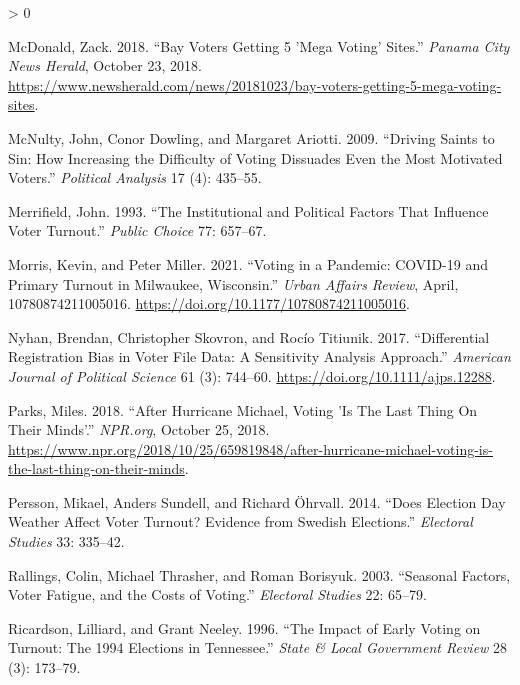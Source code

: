 \documentclass[
  12pt,
]{article}
\newlength{\cslhangindent}
\newenvironment{CSLReferences}[2] %
 {%
  \setlength{\parindent}{0pt}
  \ifodd #1 \everypar{\setlength{\hangindent}{\cslhangindent}}\ignorespaces\fi
  \ifnum #2 > 0
  \setlength{\parskip}{#2\baselineskip}
  \fi
 }%
 {}
\begin{document}
\begin{CSLReferences}{1}{0}
\leavevmode\hypertarget{ref-McDonald2018}{}%
McDonald, Zack. 2018. {``Bay Voters Getting 5 'Mega Voting' Sites.''} \emph{Panama City News Herald}, October 23, 2018. \url{https://www.newsherald.com/news/20181023/bay-voters-getting-5-mega-voting-sites}.

\leavevmode\hypertarget{ref-McNulty2009}{}%
McNulty, John, Conor Dowling, and Margaret Ariotti. 2009. {``Driving {Saints} to {Sin}: {How Increasing} the {Difficulty} of {Voting Dissuades Even} the {Most Motivated Voters}.''} \emph{Political Analysis} 17 (4): 435--55.

\leavevmode\hypertarget{ref-Merrifield1993}{}%
Merrifield, John. 1993. {``The {Institutional} and {Political Factors} That {Influence Voter Turnout}.''} \emph{Public Choice} 77: 657--67.

\leavevmode\hypertarget{ref-Morris2021}{}%
Morris, Kevin, and Peter Miller. 2021. {``Voting in a {Pandemic}: {COVID}-19 and {Primary Turnout} in {Milwaukee}, {Wisconsin}.''} \emph{Urban Affairs Review}, April, 10780874211005016. \url{https://doi.org/10.1177/10780874211005016}.

\leavevmode\hypertarget{ref-Nyhan2017}{}%
Nyhan, Brendan, Christopher Skovron, and Rocío Titiunik. 2017. {``Differential {Registration Bias} in {Voter File Data}: {A Sensitivity Analysis Approach}.''} \emph{American Journal of Political Science} 61 (3): 744--60. \url{https://doi.org/10.1111/ajps.12288}.

\leavevmode\hypertarget{ref-Parks2018}{}%
Parks, Miles. 2018. {``After {Hurricane Michael}, {Voting} '{Is The Last Thing On Their Minds}'.''} \emph{NPR.org}, October 25, 2018. \url{https://www.npr.org/2018/10/25/659819848/after-hurricane-michael-voting-is-the-last-thing-on-their-minds}.

\leavevmode\hypertarget{ref-Persson2014}{}%
Persson, Mikael, Anders Sundell, and Richard Öhrvall. 2014. {``Does {Election Day Weather Affect Voter Turnout}? {Evidence} from {Swedish Elections}.''} \emph{Electoral Studies} 33: 335--42.

\leavevmode\hypertarget{ref-Rallings2003}{}%
Rallings, Colin, Michael Thrasher, and Roman Borisyuk. 2003. {``Seasonal {Factors}, Voter Fatigue, and the Costs of Voting.''} \emph{Electoral Studies} 22: 65--79.

\leavevmode\hypertarget{ref-Ricardson1996}{}%
Ricardson, Lilliard, and Grant Neeley. 1996. {``The {Impact} of {Early Voting} on {Turnout}: {The} 1994 {Elections} in {Tennessee}.''} \emph{State \& Local Government Review} 28 (3): 173--79.


\end{CSLReferences}
\end{document}
